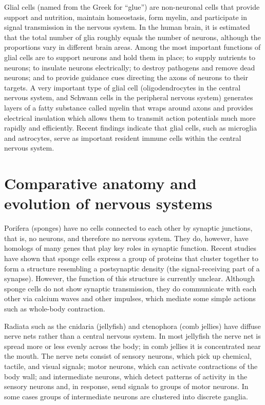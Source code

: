 Glial cells (named from the Greek for ``glue'') are non-neuronal cells that provide support and nutrition, maintain homeostasis, form myelin, and participate in signal transmission in the nervous system. In the human brain, it is estimated that the total number of glia roughly equals the number of neurons, although the proportions vary in different brain areas. Among the most important functions of glial cells are to support neurons and hold them in place; to supply nutrients to neurons; to insulate neurons electrically; to destroy pathogens and remove dead neurons; and to provide guidance cues directing the axons of neurons to their targets. A very important type of glial cell (oligodendrocytes in the central nervous system, and Schwann cells in the peripheral nervous system) generates layers of a fatty substance called myelin that wraps around axons and provides electrical insulation which allows them to transmit action potentials much more rapidly and efficiently. Recent findings indicate that glial cells, such as microglia and astrocytes, serve as important resident immune cells within the central nervous system.

\hypertarget{comparative-anatomy-and-evolution-of-nervous-systems}{%
\section{Comparative anatomy and evolution of nervous systems}\label{comparative-anatomy-and-evolution-of-nervous-systems}}

Porifera (sponges) have no cells connected to each other by synaptic junctions, that is, no neurons, and therefore no nervous system. They do, however, have homologs of many genes that play key roles in synaptic function. Recent studies have shown that sponge cells express a group of proteins that cluster together to form a structure resembling a postsynaptic density (the signal-receiving part of a synapse). However, the function of this structure is currently unclear. Although sponge cells do not show synaptic transmission, they do communicate with each other via calcium waves and other impulses, which mediate some simple actions such as whole-body contraction.

Radiata such as the cnidaria (jellyfish) and ctenophora (comb jellies) have diffuse nerve nets rather than a central nervous system. In most jellyfish the nerve net is spread more or less evenly across the body; in comb jellies it is concentrated near the mouth. The nerve nets consist of sensory neurons, which pick up chemical, tactile, and visual signals; motor neurons, which can activate contractions of the body wall; and intermediate neurons, which detect patterns of activity in the sensory neurons and, in response, send signals to groups of motor neurons. In some cases groups of intermediate neurons are clustered into discrete ganglia.

